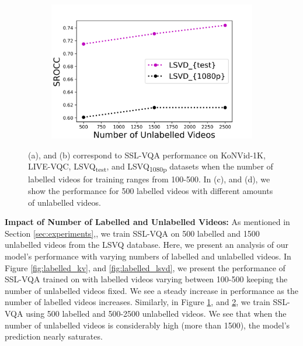 \documentclass[10pt,twocolumn,letterpaper]{article}
\begin{document}
\begin{figure}[ht]
\begin{subfigure}[b]{0.48\columnwidth}
     \caption{}
     \label{fig:unlabelled_kv}
   \end{subfigure}
   \hfill
      \begin{subfigure}[b]{0.48\columnwidth}
     \centering
     \includegraphics[width=\columnwidth,keepaspectratio]{figures/unlabel_lsvd.png}
     \caption{}
     \label{fig:unlabelled_lsvd}
   \end{subfigure}
   
   \label{fig:labelled_unlabelled}
    \caption{(a), and (b) correspond to SSL-VQA performance on KoNVid-1K, LIVE-VQC, LSVQ\textsubscript{test}, and LSVQ\textsubscript{1080p} datasets when the number of labelled videos for training ranges from 100-500. In (c), and (d), we show the performance for 500 labelled videos with different amounts of unlabelled videos.}
    \label{label_variation}
\end{figure}

\textbf{Impact of Number of Labelled and Unlabelled Videos:}
As mentioned in Section \ref{sec:experiments},, we train SSL-VQA on 500 labelled and 1500 unlabelled videos from the LSVQ \cite{patchVQ} database. Here, we present an analysis of our model's performance with varying numbers of labelled and unlabelled videos. In Figure \ref{fig:labelled_kv}, and \ref{fig:labelled_lsvd}, we present the performance of SSL-VQA trained on with labelled videos varying between 100-500 keeping the number of unlabelled videos fixed. We see a steady increase in performance as the number of labelled videos increases. Similarly, in Figure \ref{fig:unlabelled_kv}, and \ref{fig:unlabelled_lsvd}, we train SSL-VQA using 500 labelled and 500-2500 unlabelled videos. We see that when the number of unlabelled videos is considerably high (more than 1500), the model's prediction nearly saturates.
\end{document}
